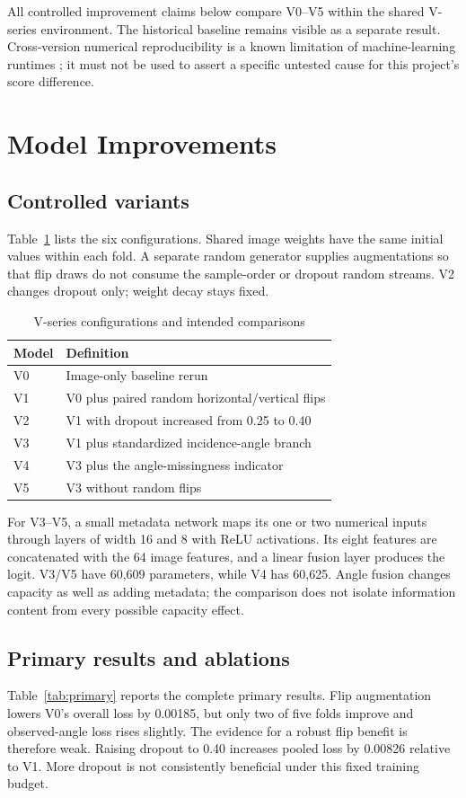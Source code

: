 \documentclass[journal]{IEEEtran}
\begin{document}
All controlled improvement claims below compare V0--V5 within the shared V-series environment. The historical baseline remains visible as a separate result. Cross-version numerical reproducibility is a known limitation of machine-learning runtimes \cite{randomness}; it must not be used to assert a specific untested cause for this project's score difference.

\section{Model Improvements}
\subsection{Controlled variants}
Table~\ref{tab:variants} lists the six configurations. Shared image weights have the same initial values within each fold. A separate random generator supplies augmentations so that flip draws do not consume the sample-order or dropout random streams. V2 changes dropout only; weight decay stays fixed.

\begin{table}[t]
\caption{V-series configurations and intended comparisons}
\label{tab:variants}\centering
\begin{tabularx}{\columnwidth}{lX}\toprule
Model & Definition\\\midrule
V0 & Image-only baseline rerun\\
V1 & V0 plus paired random horizontal/vertical flips\\
V2 & V1 with dropout increased from 0.25 to 0.40\\
V3 & V1 plus standardized incidence-angle branch\\
V4 & V3 plus the angle-missingness indicator\\
V5 & V3 without random flips\\\bottomrule
\end{tabularx}
\end{table}

For V3--V5, a small metadata network maps its one or two numerical inputs through layers of width 16 and 8 with ReLU activations. Its eight features are concatenated with the 64 image features, and a linear fusion layer produces the logit. V3/V5 have 60,609 parameters, while V4 has 60,625. Angle fusion changes capacity as well as adding metadata; the comparison does not isolate information content from every possible capacity effect.

\subsection{Primary results and ablations}
Table~\ref{tab:primary} reports the complete primary results. Flip augmentation lowers V0's overall loss by 0.00185, but only two of five folds improve and observed-angle loss rises slightly. The evidence for a robust flip benefit is therefore weak. Raising dropout to 0.40 increases pooled loss by 0.00826 relative to V1. More dropout is not consistently beneficial under this fixed training budget.
\end{document}

